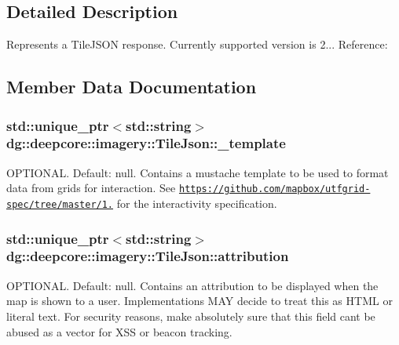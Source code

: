 \subsection{Detailed Description}
Represents a Tile\+J\+S\+ON response. Currently supported version is 2... Reference\+: \href{https://github.com/mapbox/tilejson-spec/tree/master/2.0.0}{\tt } 

\subsection{Member Data Documentation}
\subsubsection[{\texorpdfstring{\+\_\+template}{_template}}]{\setlength{\rightskip}{0pt plus 5cm}std\+::unique\+\_\+ptr$<$std\+::string$>$ dg\+::deepcore\+::imagery\+::\+Tile\+Json\+::\+\_\+template}\hypertarget{structdg_1_1deepcore_1_1imagery_1_1_tile_json_aed003e5b44a92c2dcaf84a71fa19acd0}{}\label{structdg_1_1deepcore_1_1imagery_1_1_tile_json_aed003e5b44a92c2dcaf84a71fa19acd0}
O\+P\+T\+I\+O\+N\+AL. Default\+: null. Contains a mustache template to be used to format data from grids for interaction. See \href{https://github.com/mapbox/utfgrid-spec/tree/master/1.2}{\tt https\+://github.\+com/mapbox/utfgrid-\/spec/tree/master/1.} for the interactivity specification. 
\subsubsection[{\texorpdfstring{attribution}{attribution}}]{\setlength{\rightskip}{0pt plus 5cm}std\+::unique\+\_\+ptr$<$std\+::string$>$ dg\+::deepcore\+::imagery\+::\+Tile\+Json\+::attribution}\hypertarget{structdg_1_1deepcore_1_1imagery_1_1_tile_json_aaa14afeb610f9e02b8ffb7e6641160d6}{}\label{structdg_1_1deepcore_1_1imagery_1_1_tile_json_aaa14afeb610f9e02b8ffb7e6641160d6}
O\+P\+T\+I\+O\+N\+AL. Default\+: null. Contains an attribution to be displayed when the map is shown to a user. Implementations M\+AY decide to treat this as H\+T\+ML or literal text. For security reasons, make absolutely sure that this field can\textquotesingle{}t be abused as a vector for X\+SS or beacon tracking. 
